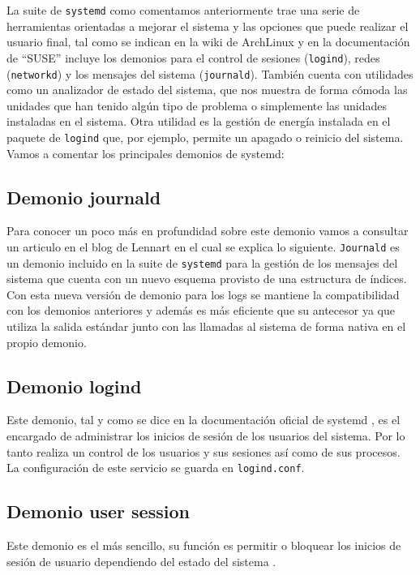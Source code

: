 La suite de \texttt{systemd} como comentamos anteriormente trae una serie de herramientas orientadas a mejorar el sistema y las opciones que puede realizar el usuario final, tal como se indican en la wiki de ArchLinux \cite{systemd_es} y en la documentación de ``SUSE'' \cite{suse_doc} incluye los demonios para el control de sesiones (\texttt{logind}), redes (\texttt{networkd}) y los mensajes del sistema (\texttt{journald}). También cuenta con utilidades como un analizador de estado del sistema, que nos muestra de forma cómoda las unidades que han tenido algún tipo de problema o simplemente las unidades instaladas en el sistema. Otra utilidad es la gestión de energía instalada en el paquete de \texttt{logind} que, por ejemplo, permite un apagado o reinicio del sistema.\\


Vamos a comentar los principales demonios de systemd:

\subsection{Demonio journald}
Para conocer un poco más en profundidad sobre este demonio vamos a consultar un articulo en el blog de Lennart \cite{Journald} en el cual se explica lo siguiente. \texttt{Journald} es un demonio incluido en la suite de \texttt{systemd} para la gestión de los mensajes del sistema que cuenta con un nuevo esquema provisto de una estructura de índices. Con esta nueva versión de demonio para los logs se mantiene la compatibilidad con los demonios anteriores y además es más eficiente que su antecesor ya que utiliza la salida estándar junto con las llamadas al sistema de forma nativa en el propio demonio.

\subsection{Demonio logind}
Este demonio, tal y como se dice en la documentación oficial de systemd \cite{man_systemd_logind}, es el encargado de administrar los inicios de sesión de los usuarios del sistema. Por lo tanto realiza un control de los usuarios y sus sesiones así como de sus procesos. La configuración de este servicio se guarda en \texttt{logind.conf}.

\subsection{Demonio user session}
Este demonio es el más sencillo, su función es permitir o bloquear los inicios de sesión de usuario dependiendo del estado del sistema \cite{man_systemd_user-sessions}.



